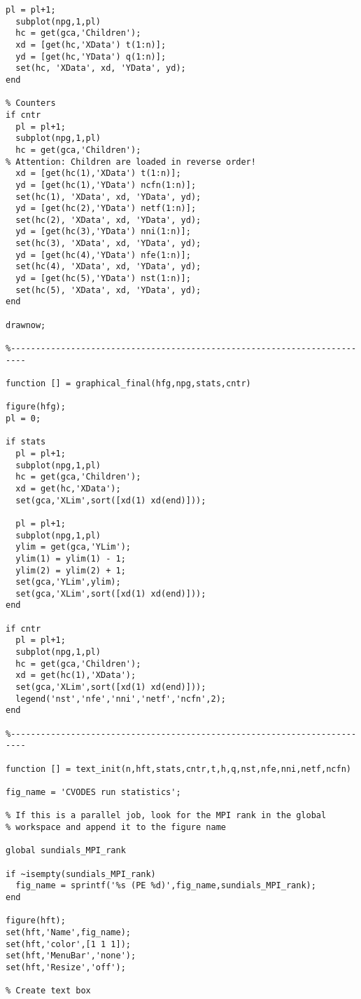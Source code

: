 \begin{lstlisting}[linerange={1-1,45-797}]
  pl = pl+1;
  subplot(npg,1,pl)
  hc = get(gca,'Children');
  xd = [get(hc,'XData') t(1:n)];
  yd = [get(hc,'YData') q(1:n)];
  set(hc, 'XData', xd, 'YData', yd);
end

% Counters
if cntr
  pl = pl+1;
  subplot(npg,1,pl)
  hc = get(gca,'Children');
% Attention: Children are loaded in reverse order!
  xd = [get(hc(1),'XData') t(1:n)];
  yd = [get(hc(1),'YData') ncfn(1:n)];
  set(hc(1), 'XData', xd, 'YData', yd);
  yd = [get(hc(2),'YData') netf(1:n)];
  set(hc(2), 'XData', xd, 'YData', yd);
  yd = [get(hc(3),'YData') nni(1:n)];
  set(hc(3), 'XData', xd, 'YData', yd);
  yd = [get(hc(4),'YData') nfe(1:n)];
  set(hc(4), 'XData', xd, 'YData', yd);
  yd = [get(hc(5),'YData') nst(1:n)];
  set(hc(5), 'XData', xd, 'YData', yd);
end

drawnow;

%-------------------------------------------------------------------------

function [] = graphical_final(hfg,npg,stats,cntr)

figure(hfg);
pl = 0;

if stats
  pl = pl+1;
  subplot(npg,1,pl)
  hc = get(gca,'Children');
  xd = get(hc,'XData');
  set(gca,'XLim',sort([xd(1) xd(end)]));
  
  pl = pl+1;
  subplot(npg,1,pl)
  ylim = get(gca,'YLim');
  ylim(1) = ylim(1) - 1;
  ylim(2) = ylim(2) + 1;
  set(gca,'YLim',ylim);
  set(gca,'XLim',sort([xd(1) xd(end)]));
end

if cntr
  pl = pl+1;
  subplot(npg,1,pl)
  hc = get(gca,'Children');
  xd = get(hc(1),'XData');
  set(gca,'XLim',sort([xd(1) xd(end)]));
  legend('nst','nfe','nni','netf','ncfn',2);
end

%-------------------------------------------------------------------------

function [] = text_init(n,hft,stats,cntr,t,h,q,nst,nfe,nni,netf,ncfn)

fig_name = 'CVODES run statistics';

% If this is a parallel job, look for the MPI rank in the global
% workspace and append it to the figure name

global sundials_MPI_rank

if ~isempty(sundials_MPI_rank)
  fig_name = sprintf('%s (PE %d)',fig_name,sundials_MPI_rank);
end

figure(hft);
set(hft,'Name',fig_name);
set(hft,'color',[1 1 1]);
set(hft,'MenuBar','none');
set(hft,'Resize','off');

% Create text box


\end{lstlisting}
